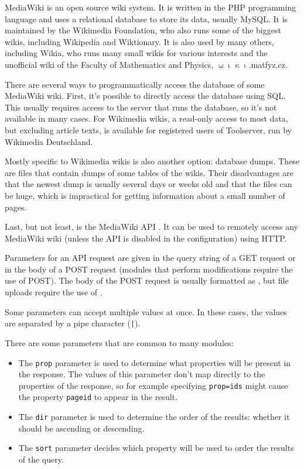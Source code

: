 
MediaWiki is an open source wiki system.
It is written in the \acs{PHP} programming language and uses a relational database to store its data, usually MySQL.
It is maintained by the Wikimedia Foundation, who also runs some of the biggest wikis, including Wikipedia and Wiktionary.
It is also used by many others, including Wikia, who runs many small wikis for various interests and
the unofficial wiki of the Faculty of Mathematics and Physics, $\upomega\upiota\upkappa\upiota$.matfyz.cz.

\medskip

There are several ways to programmatically access the database of some MediaWiki wiki.
First, it's possible to directly access the database using \ac{SQL}.
This usually requires access to the server that runs the database, so it's not available in many cases.
For Wikimedia wikis, a read-only access to most data, but excluding article texts,
is available for registered users of Toolserver, run by Wikimedia Deutschland.

Mostly specific to Wikimedia wikis is also another option: database dumps. These are files that contain
dumps of some tables of the wikis. Their disadvantages are that the newest dump is usually several days or weeks old
and that the files can be huge, which is impractical for getting information about a small number of pages.

Last, but not least, is the MediaWiki API \cite{mediawiki-api}.
It can be used to remotely access any MediaWiki wiki (unless the \ac{API} is disabled in the configuration)
using \ac{HTTP}.

\medskip

Parameters for an \ac{API} request are given in the query string of a GET request or in the body of a POST request
(modules that perform modifications require the use of POST).
The body of the POST request is usually formatted as ,
but file uploads require the use of .

Some parameters can accept multiple values at once.
In these cases, the values are separated by a pipe character (\texttt{|}).

There are some parameters that are common to many modules:

\begin{itemize}
\item The \texttt{prop} parameter is used to determine what properties will be present in the response.
The values of this parameter don't map directly to the properties of the response,
so for example specifying \texttt{prop=ids} might cause the property \texttt{pageid} to appear in the result.
\item The \texttt{dir} parameter is used to determine the order of the results:
whether it should be ascending or descending.
\item The \texttt{sort} parameter decides which property will be used to order the results of the query.
\end{itemize}

